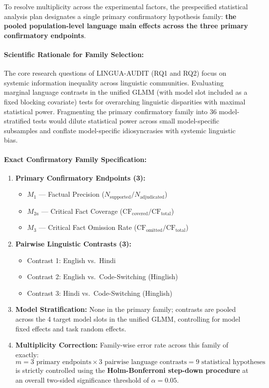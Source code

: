 \documentclass[11pt,a4paper]{article}
\begin{document}
To resolve multiplicity across the experimental factors, the prespecified statistical analysis plan designates a single primary confirmatory hypothesis family: \textbf{the pooled population-level language main effects across the three primary confirmatory endpoints}.

\paragraph{Scientific Rationale for Family Selection:} The core research questions of LINGUA-AUDIT (RQ1 and RQ2) focus on systemic information inequality across linguistic communities. Evaluating marginal language contrasts in the unified GLMM (with model slot included as a fixed blocking covariate) tests for overarching linguistic disparities with maximal statistical power. Fragmenting the primary confirmatory family into 36 model-stratified tests would dilute statistical power across small model-specific subsamples and conflate model-specific idiosyncrasies with systemic linguistic bias.

\paragraph{Exact Confirmatory Family Specification:}
\begin{enumerate}
  \item \textbf{Primary Confirmatory Endpoints (3):}
    \begin{itemize}
      \item $M_1$ --- Factual Precision ($N_{\text{supported}} / N_{\text{adjudicated}}$)
      \item $M_{2a}$ --- Critical Fact Coverage ($\text{CF}_{\text{covered}} / \text{CF}_{\text{total}}$)
      \item $M_3$ --- Critical Fact Omission Rate ($\text{CF}_{\text{omitted}} / \text{CF}_{\text{total}}$)
    \end{itemize}
  \item \textbf{Pairwise Linguistic Contrasts (3):}
    \begin{itemize}
      \item Contrast 1: English vs.\ Hindi
      \item Contrast 2: English vs.\ Code-Switching (Hinglish)
      \item Contrast 3: Hindi vs.\ Code-Switching (Hinglish)
    \end{itemize}
  \item \textbf{Model Stratification:} None in the primary family; contrasts are pooled across the 4 target model slots in the unified GLMM, controlling for model fixed effects and task random effects.
  \item \textbf{Multiplicity Correction:} Family-wise error rate across this family of exactly:
    \begin{equation}
    \label{eq:hypotheses}
    m = 3 \text{ primary endpoints} \times 3 \text{ pairwise language contrasts} = 9 \text{ statistical hypotheses}
    \end{equation}
    is strictly controlled using the \textbf{Holm-Bonferroni step-down procedure} at an overall two-sided significance threshold of $\alpha = 0.05$.
\end{enumerate}
\end{document}
